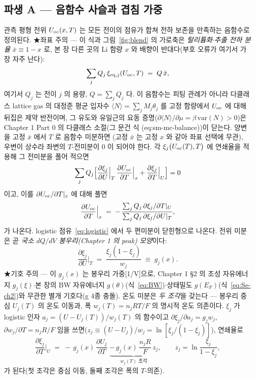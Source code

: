 \subsection{파생 A --- 음함수 사슬과 겹침 가중}\label{ssec:overlap}
관측 평형 전위 $U_{\mathrm{oc}}(x,T)$ 는 모든 전이의 점유가 합쳐 전하 보존을 만족하는 음함수로 정의된다. ★좌표 주의
--- 이 식과 그림~\ref{fig:blend} 의 가로축은 \emph{탈리튬화$\cdot$추출 전하 분율} $\bar x\equiv1-x$ 로, 본 장
다른 곳의 Li 함량 $x$ 와 배향이 반대다(부호 오류가 여기서 가장 자주 난다):
\begin{equation}
\sum_j Q_j\,\xi_{\mathrm{eq},j}(U_{\mathrm{oc}},T) \;=\; Q\,\bar x,
\label{eq:implicit}
\end{equation}
여기서 $Q_j$ 는 전이 $j$ 의 용량, $Q=\sum_j Q_j$ 다. 이 음함수는 피팅 관례가 아니라 다클래스 lattice gas 의
대정준 평균 입자수 $\langle N\rangle=\sum_jM_j\theta_j$ 를 고정 함량에서 $U_{\mathrm{oc}}$ 에 대해 뒤집은 제약
반전이며, 그 유도와 유일근의 요동 증명($\partial\langle N\rangle/\partial\mu=\beta\,\mathrm{var}(N)>0$)은
Chapter 1 Part 0 의 다클래스 소절(그 문건 식 (eq:sm-mc-balance))이 닫는다. 양변을 고정 $\bar x$ 에서 $T$ 로 음함수 미분하면
(고정 $\bar x$ 는 고정 $x$ 와 같아 좌표 선택에 무관), 우변이 상수라 좌변의 $T$-전미분이 $0$ 이 되어야
한다. 각 $\xi_j\bigl(U_{\mathrm{oc}}(T),T\bigr)$ 에 연쇄율을 적용해 그 전미분을 풀어 적으면
\[
\sum_j Q_j\Big[\frac{\partial\xi_j}{\partial U}\Big|_T\,\frac{\partial U_{\mathrm{oc}}}{\partial T}\Big|_x
+\frac{\partial\xi_j}{\partial T}\Big|_U\Big]=0
\]
이고, 이를 $\partial U_{\mathrm{oc}}/\partial T|_x$ 에 대해 풀면
\begin{equation}
\frac{\partial U_{\mathrm{oc}}}{\partial T}\Big|_x
\;=\; -\,\frac{\sum_j Q_j\,\partial\xi_j/\partial T|_U}{\sum_j Q_j\,\partial\xi_j/\partial U|_T},
\label{eq:implicit_diff}
\end{equation}
가 나온다. logistic 점유~\eqref{eq:logistic} 에서 두 편미분이 닫힌형으로 나온다. 전위 미분은 곧 \emph{국소
$dQ/dV$ 봉우리(Chapter 1 의 peak) 모양}이다:
\begin{equation}
\frac{\partial\xi_j}{\partial U}\Big|_T \;=\; \frac{\xi_j(1-\xi_j)}{w_j} \;\equiv\; g_j(x).
\label{eq:gj}
\end{equation}
★기호 주의 --- 이 $g_j(x)$ 는 봉우리 가중[1/V]으로, Chapter 1 §2 의 조성 자유에너지 $g_j(\xi)$$\cdot$본 장의
BW 자유에너지 $g(\theta)$(식~\eqref{eq:BW})$\cdot$상태밀도 $g(E_F)$(식~\eqref{eq:Se-ch2})와 무관한 별개
기호다(g 4종 충돌). 온도 미분은 \emph{두 조각}을 갖는다 --- 봉우리 중심 $U_j(T)$ 의 온도 이동과,
폭 $w_j(T)=n_jRT/F$ 의 명시적 온도 의존이다. $\xi_j$ 가 logistic 인자 $a_j=(U-U_j(T))/w_j(T)$ 의 함수이고
$\partial\xi_j/\partial a_j=g_j w_j$, $\partial w_j/\partial T=n_jR/F$ 임을 쓰면($z_j\equiv(U-U_j)/w_j=\ln[\xi_j/
(1-\xi_j)]$), 연쇄율로
\begin{equation}
\frac{\partial\xi_j}{\partial T}\Big|_U
\;=\; -\,g_j(x)\,\frac{\partial U_j}{\partial T}
\;\underbrace{-\,g_j(x)\,\frac{n_jR}{F}\,z_j}_{w_j(T)\text{ 조각}},
\qquad z_j=\ln\frac{\xi_j}{1-\xi_j},
\label{eq:dxidT}
\end{equation}
가 된다(첫 조각은 중심 이동, 둘째 조각은 폭의 $T$-의존).

